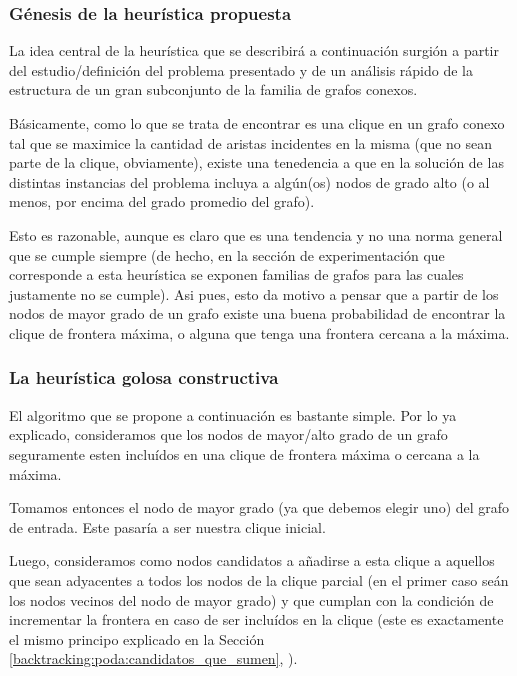 \subsubsection{G\'enesis de la heur\'istica propuesta}
\par La idea central de la heur\'istica que se describir\'a a continuaci\'on
    surgi\'on a partir del estudio/definici\'on del problema presentado
    y de un an\'alisis r\'apido de la estructura de un gran subconjunto
    de la familia de grafos conexos.

\par B\'asicamente, como lo que se trata de encontrar es una clique
    en un grafo conexo tal que se maximice la cantidad de aristas
    incidentes en la misma (que no sean parte de la clique, obviamente),
    existe una tenedencia a que en la soluci\'on de las distintas
    instancias del problema incluya a alg\'un(os) nodos de grado
    alto (o al menos, por encima del grado promedio del grafo).

\par Esto es razonable, aunque es claro que es una tendencia y no
    una norma general que se cumple siempre (de hecho, en la secci\'on
    de experimentaci\'on que corresponde a esta heur\'istica se exponen
    familias de grafos para las cuales justamente no se cumple). Asi pues,
    esto da motivo a pensar que a partir de los nodos de mayor grado
    de un grafo existe una buena probabilidad de encontrar la clique
    de frontera m\'axima, o alguna que tenga una frontera cercana
    a la m\'axima.

\subsubsection{La heur\'istica golosa constructiva}\label{goloso:explicacion}
\par El algoritmo que se propone a continuaci\'on es bastante simple.
    Por lo ya explicado, consideramos que los nodos de mayor/alto
    grado de un grafo seguramente esten inclu\'idos en una clique
    de frontera m\'axima o cercana a la m\'axima.

\par Tomamos entonces el nodo de mayor grado (ya que debemos elegir uno)
    del grafo de entrada. Este pasar\'ia a ser nuestra clique inicial.

\par Luego, consideramos como nodos candidatos a a\~nadirse a esta
    clique a aquellos que sean adyacentes a todos los nodos de la
    clique parcial (en el primer caso se\'an los nodos vecinos del
    nodo de mayor grado) y que cumplan con la condici\'on de incrementar
    la frontera en caso de ser inclu\'idos en la clique (este es
    exactamente el mismo principo explicado en la Secci\'on
    \ref{backtracking:poda:candidatos_que_sumen},
    \emph{}).

